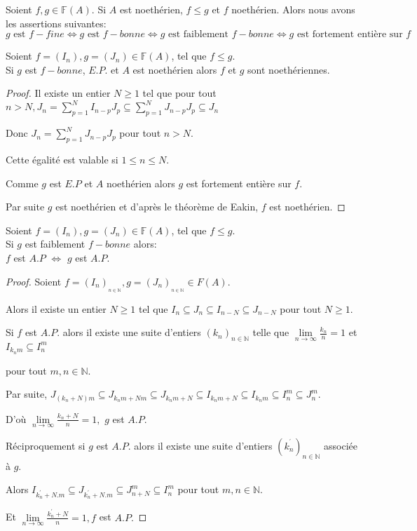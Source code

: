 \begin{moncorollaire}
	Soient $f,g \in \mathbb{F}(A)$. Si $A$ est noethérien, $f \leqslant g$ et $f$ noethérien. Alors nous avons les assertions suivantes:
	\[ g \text{ est } f-fine \Longleftrightarrow  g \text{ est } f-bonne \Longleftrightarrow  g \text{ est faiblement } f-bonne \Longleftrightarrow  g \text{ est fortement entière sur } f \]
\end{moncorollaire}
\begin{maproposition}
	Soient $f=(I_n), g=(J_n) \in \mathbb{F}(A)$, tel que $f \leqslant g$.\\ Si $g$ est $f-bonne$, $E.P.$ et $A$ est noethérien alors $f$ et $g$ sont noethériennes.
\end{maproposition}
\begin{proof}
	Il existe un entier $N\geq 1$ tel que pour tout $n>N,J_{n}=\sum%
	\limits_{p=1}^{N}I_{n-p}J_{p}\subseteq
	\sum\limits_{p=1}^{N}J_{n-p}J_{p}\subseteq J_{n}$
	
	Donc $J_{n}=\sum\limits_{p=1}^{N}J_{n-p}J_{p}$ pour tout $n>N.$
	
	Cette égalité est valable si $1\leq n\leq N.$
	
	Comme $g$ est $E.P$ et $A$ noethérien alors $g$ est fortement entière sur $f.$ 
	
	Par suite $g$ est noethérien et d'après le théorème de
	Eakin, $f$ est noethérien. 
\end{proof}
\begin{maproposition}
	Soient $f=(I_n), g=(J_n) \in \mathbb{F}(A)$, tel que $f \leqslant g$.\\Si $g$ est faiblement $f-bonne$ alors:\\ $f$ est $A.P$ $\Longleftrightarrow$ $g$ est $A.P$.
\end{maproposition}
\begin{proof}
	Soient $f=(I_{n})_{_{n\in \mathbb{N}}},g=(J_{n})_{_{n\in\mathbb{N}}}\in F(A).$
	
	Alors il existe un entier $N\geq 1$ tel que $I_{n}\subseteq J_{n}\subseteq
	I_{n-N}\subseteq J_{n-N}$ pour tout $N\geq 1.$
	
	Si $f$ est $A.P.$ alors il existe une suite d'entiers $(k_{n})_{n\in \mathbb{N}}$ telle que $\underset{n\longrightarrow \infty }{\lim }\frac{k_{n}}{n}=1$
	et $I_{k_{n}m}\subseteq I_{n}^{m}$
	
	pour tout $m,n\in \mathbb{N}.$
	
	Par suite, $J_{(k_{n}+N)m}\subseteq J_{k_{n}m+Nm}\subseteq
	J_{k_{n}m+N}\subseteq I_{k_{n}m+N}\subseteq I_{k_{n}m}\subseteq
	I_{n}^{m}\subseteq J_{n}^{m}.$
	
	D'où $\underset{n\longrightarrow \infty }{\lim }\frac{k_{n}+N}{n%
	}=1,$ $g$ est $A.P.$
	
	Réciproquement si $g$ est $A.P.$ alors il existe une suite d'entiers $(k_{n}^{^{\prime }})_{n\in \mathbb{N}}$ associée à $g.$
	
	Alors $I_{k_{n}^{\prime }+N.m}\subseteq J_{k_{n}^{\prime }+N.m}\subseteq
	J_{n+N}^{m}\subseteq I_{n}^{m}$ pour tout $m,n\in \mathbb{N}.$
	
	Et $\underset{n\longrightarrow \infty }{\lim }\frac{k_{n}^{\prime }+N}{n}=1,f
	$ est $A.P.$
\end{proof}

